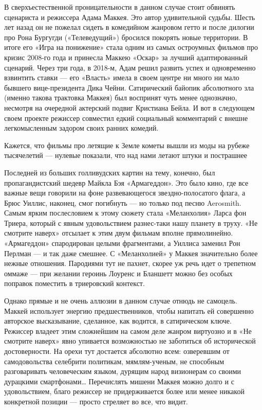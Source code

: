 В сверхъестественной проницательности в данном случае стоит обвинять сценариста и режиссера Адама Маккея. Это автор удивительной судьбы. Шесть лет назад он не пожелал сидеть в комедийном жанровом гетто и после дилогии про Рона Бургугди («Телеведущий») бросился покорять новые территории. В итоге его «Игра на понижение» стала одним из самых остроумных фильмов про кризис 2008-го года и принесла Маккею «Оскар» за лучший адаптированный сценарий. Через три года, в 2018-м, Адам решил развить успех и одновременно взвинтить ставки --- его «Власть» имела в своем центре ни много ни мало бывшего вице-президента Дика Чейни. Сатирический байопик абсолютного зла (именно такова трактовка Маккея) был воспринят чуть менее однозначно, несмотря на очередной актерский подвиг Кристиана Бейла. И вот в следующем своем проекте режиссер совместил едкий социальный комментарий с внешне легкомысленным задором своих ранних комедий.

\begin{fancyquotes}
    Кажется, что фильмы про летящие к Земле кометы вышли из моды на рубеже тысячелетий --- нулевые показали, что над нами летают штуки и пострашнее
\end{fancyquotes}

Последней из больших голливудских картин на тему, конечно, был пропагандистский шедевр Майкла Бэя «Армагеддон». Это было кино, где все важные вещи говорили на фоне развевающегося звездно-полосатого флага, а Брюс Уиллис, наконец, смог погибнуть --- но только под песню Aerosmith. Самым ярким послесловием к этому сюжету стала «Меланхолия» Ларса фон Триера, который с явным удовольствием разнес-таки нашу планету в труху. «Не смотрите наверх» отсылает к этим двум фильмам вполне прямолинейно. «Армагеддон» спародирован целыми фрагментами, а Уиллиса заменил Рон Перлман --- и так даже смешнее. С «Меланхолией» у Маккея значительно более нежные отношения. Пародиями тут не пахнет, скорее уж речь идет о трепетном оммаже --- при желании героинь Лоуренс и Бланшетт можно без особых поправок поместить в триеровский контекст.

Однако прямые и не очень аллюзии в данном случае отнюдь не самоцель. Маккей использует энергию предшественников, чтобы напитать ей совершенно авторское высказывание, сделанное, как водится, в сатирическом ключе. Режиссер владеет этим сложнейшим на самом деле жанром виртуозно и в «Не смотрите наверх» явно упивается возможностью не заботиться об исторической достоверности. На орехи тут достается абсолютно всем: озверевшим от самодовольства селебрити политикам, мямлям-ученым, не способным разговаривать человеческим языком, дурящим народ визионерам со своими дурацкими смартфонами… Перечислять мишени Маккея можно долго и с удовольствием, благо режиссер не придерживается более или менее никакой конкретной позиции --- просто стреляет во все, что видит.


